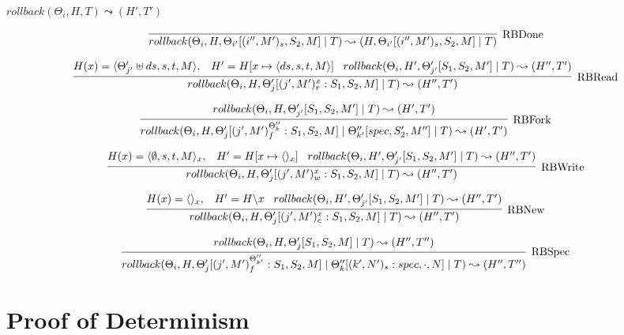 \documentclass[9pt]{article}
\begin{document}

$\boxed{rollback(\Theta_i, H, T) \leadsto (H' ,T')}$

\[%
\infer[\text{RBDone}]{rollback(\Theta_i, H, \Theta_{i'}[(i'', M')_s, S_2, M] \; | \; T) \leadsto (H, \Theta_{i'}[(i'', M')_s, S_2, M] \; | \; T)}{}
\]

\[%
\infer[\text{RBRead}]{rollback(\Theta_i, H, \Theta_j'[(j', M')_r^x : S_1, S_2, M] \; | \; T) \leadsto (H'', T')}{H(x) = \langle \Theta_{j'}' \uplus ds, s, t, M\rangle, \;\;\; H' = H[x \mapsto \langle ds, s, t, M\rangle] \;\;\; rollback(\Theta_i, H', \Theta_{j'}'[S_1, S_2, M'] \; | \; T) \leadsto (H'', T')}
\]

\[%
\infer[\text{RBFork}]{rollback(\Theta_i, H, \Theta_j'[(j', M')_f^{\Theta_k''} : S_1, S_2, M] \; | \; \Theta_{k'}''[spec, S_2', M''] \; | \; T) \leadsto (H', T')}{rollback(\Theta_i, H, \Theta_{j'}'[S_1, S_2, M'] \; | \; T) \leadsto (H', T')}
\]

\[%
\infer[\text{RBWrite}]{rollback(\Theta_i, H, \Theta_j'[(j', M')_w^x : S_1, S_2, M] \; | \; T) \leadsto (H'', T')}{H(x) = \langle \emptyset, s, t, M\rangle_x, \;\;\; H' = H[x \mapsto \langle\rangle_x] \;\;\; rollback(\Theta_i, H', \Theta_{j'}'[S_1, S_2, M'] \; | \; T) \leadsto (H'', T')}
\]

\[%
\infer[\text{RBNew}]{rollback(\Theta_i, H, \Theta_j'[(j', M')_c^x : S_1, S_2, M] \; | \; T) \leadsto (H'', T')}{H(x) = \langle\rangle_x, \;\;\; H' = H \backslash x \;\;\; rollback(\Theta_i, H', \Theta_{j'}'[S_1, S_2, M'] \; | \; T) \leadsto (H'', T')}
\]

\[%
\infer[\text{RBSpec}]{rollback(\Theta_i, H, \Theta_j'[(j', M')_f^{\Theta_{k'}''} : S_1, S_2, M] \; | \; \Theta_k''[(k', N')_s : spec, \cdot, N] \; | \; T) \leadsto (H'', T'')}{rollback(\Theta_i, H, \Theta_j'[S_1, S_2, M] \; | \; T) \leadsto (H'', T'')}
\]


\section{Proof of Determinism}
\end{document}
